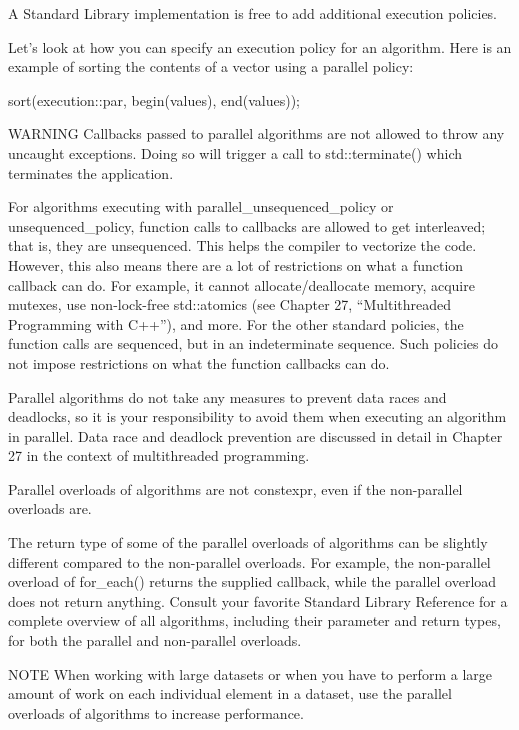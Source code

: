 A Standard Library implementation is free to add additional execution policies.

Let’s look at how you can specify an execution policy for an algorithm. Here is an example of sorting the contents of a vector using a parallel policy:

\begin{cpp}
sort(execution::par, begin(values), end(values));
\end{cpp}

\begin{myWarning}{WARNING}
Callbacks passed to parallel algorithms are not allowed to throw any uncaught exceptions. Doing so will trigger a call to std::terminate() which terminates the application.
\end{myWarning}

For algorithms executing with parallel\_unsequenced\_policy or unsequenced\_policy, function calls to callbacks are allowed to get interleaved; that is, they are unsequenced. This helps the compiler to vectorize the code. However, this also means there are a lot of restrictions on what a function callback can do. For example, it cannot allocate/deallocate memory, acquire mutexes, use non-lock-free std::atomics (see Chapter 27, “Multithreaded Programming with C++”), and more. For the other standard policies, the function calls are sequenced, but in an indeterminate sequence. Such policies do not impose restrictions on what the function callbacks can do.

Parallel algorithms do not take any measures to prevent data races and deadlocks, so it is your responsibility to avoid them when executing an algorithm in parallel. Data race and deadlock prevention are discussed in detail in Chapter 27 in the context of multithreaded programming.

Parallel overloads of algorithms are not constexpr, even if the non-parallel overloads are.

The return type of some of the parallel overloads of algorithms can be slightly different compared to the non-parallel overloads. For example, the non-parallel overload of for\_each() returns the supplied callback, while the parallel overload does not return anything. Consult your favorite Standard Library Reference for a complete overview of all algorithms, including their parameter and return types, for both the parallel and non-parallel overloads.

\begin{myNotic}{NOTE}
When working with large datasets or when you have to perform a large amount of work on each individual element in a dataset, use the parallel overloads of algorithms to increase performance.
\end{myNotic}

